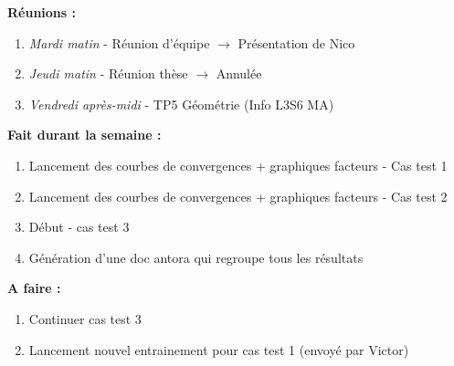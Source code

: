 \textbf{Réunions :}
\begin{enumerate}[label=\textbullet]
	\item \textit{Mardi matin} - Réunion d'équipe $\rightarrow$ Présentation de Nico
	\item \textit{Jeudi matin} - Réunion thèse $\rightarrow$ Annulée
	\item \textit{Vendredi après-midi} - TP5 Géométrie (Info L3S6 MA)
\end{enumerate}
\textbf{Fait durant la semaine :}
\begin{enumerate}[label=\textbullet]
	\item Lancement des courbes de convergences + graphiques facteurs - Cas test 1
	\item Lancement des courbes de convergences + graphiques facteurs - Cas test 2
	\item Début - cas test 3
	\item Génération d'une doc antora qui regroupe tous les résultats
\end{enumerate}
\textbf{A faire :}
\begin{enumerate}[label=\textbullet]
	\item Continuer cas test 3
	\item Lancement nouvel entrainement pour cas test 1 (envoyé par Victor)
\end{enumerate}